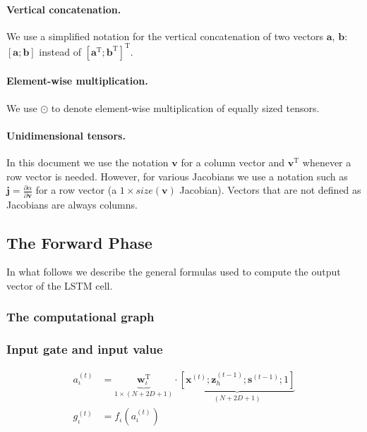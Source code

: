 \documentclass[11pt]{article}
\begin{document}
\paragraph{Vertical concatenation.} We use a simplified notation for
the vertical concatenation of two vectors $\mathbf{a}$, $\mathbf{b}$:
$\left[\mathbf{a}; \mathbf{b}\right]$ instead of
$\left[ \mathbf{a}^{\text{T}} ; \mathbf{b}^{\text{T}}
\right]^{\text{T}}$.

\paragraph{Element-wise multiplication.} We use $\odot$ to denote
element-wise multiplication of equally sized tensors.

\paragraph{Unidimensional tensors.}

In this document we use the notation $\mathbf{v}$ for a column vector
and $\mathbf{v}^{\text{T}}$ whenever a row vector is needed. However,
for various Jacobians we use a notation such as
$\mathbf{j} = \frac{\partial \alpha}{\partial \mathbf{v}}$ for a row
vector (a $1\times size(\mathbf{v})$ Jacobian). Vectors that are not
defined as Jacobians are always columns.

\subsection{The Forward Phase}

In what follows we describe the general formulas used to compute the
output vector of the LSTM cell.

\subsubsection*{The computational graph}

\begin{center}
  
\end{center}

\subsubsection*{Input gate and input value}

\begin{align}
  a_{\iota}^{(t)}
  & = \underbrace{\mathbf{w}_{\iota}^{\text{T}}}_{1\times(N+2D+1)}
    \cdot \underbrace{\left[\mathbf{x}^{(t)};
    \mathbf{z}_{h}^{(t-1)}; \mathbf{s}^{(t-1)};
    1\right]}_{(N+2D+1)} \\
  g_{\iota}^{(t)}
  & = f_{\iota}\left(a_{\iota}^{(t)}\right)
\end{align}
\end{document}
